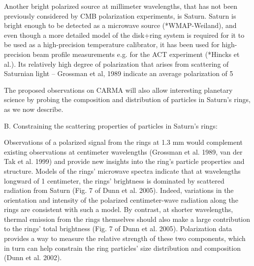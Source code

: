 Another bright polarized source at millimeter wavelengths, that has not been previously considered by CMB polarization experiments, is Saturn. Saturn is bright enough to be detected as a microwave source (*WMAP-Weiland), and even though a more detailed model of the disk+ring system is required for it to be used as a high-precision temperature calibrator, it has been used for high-precision beam profile measurements e.g. for the ACT experiment (*Hincks et al.). Its relatively high degree of polarization that arises from scattering of Saturnian light -- Grossman et al, 1989 indicate an average polarization of 5%

The proposed observations on CARMA will also allow interesting planetary science by probing the composition and distribution of particles in Saturn's rings, as we now describe.

B. Constraining the scattering properties of particles in Saturn's rings:

Observations of a polarized signal from the rings at 1.3 mm would complement existing observations at centimeter wavelengths  (Grossman et al. 1989, van der Tak et al. 1999) and provide new insights into the ring's particle properties and structure. Models of the rings' microwave spectra indicate that at wavelengths longward of 1 centimeter, the rings' brightness is dominated by scattered radiation from Saturn (Fig. 7 of Dunn et al. 2005). Indeed, variations in the orientation and intensity of the polarized centimeter-wave radiation along the rings are consistent with such a model. By contrast, at shorter wavelengths, thermal emission from the rings themselves should also make a large contribution to the rings' total brightness (Fig. 7 of Dunn et al. 2005). Polarization data provides a way to measure the relative strength of these two components, which in turn can help constrain the ring particles' size distribution and composition (Dunn et al. 2002).

